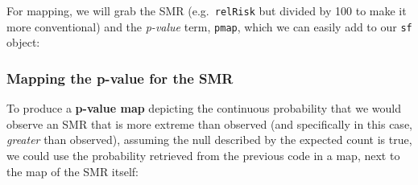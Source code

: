 \documentclass[
]{book}
\newenvironment{Shaded}{\begin{snugshade}}{\end{snugshade}}
\newcommand{\DecValTok}[1]{\textcolor[rgb]{0.00,0.00,0.81}{#1}}
\newcommand{\NormalTok}[1]{#1}
\newcommand{\OtherTok}[1]{\textcolor[rgb]{0.56,0.35,0.01}{#1}}
\newcommand{\SpecialCharTok}[1]{\textcolor[rgb]{0.00,0.00,0.00}{#1}}
\begin{document}
For mapping, we will grab the SMR (e.g.~\texttt{relRisk} but divided by 100 to make it more conventional) and the \emph{p-value} term, \texttt{pmap}, which we can easily add to our \texttt{sf} object:

\begin{Shaded}
\end{Shaded}

\hypertarget{mapping-the-p-value-for-the-smr}{%
\subsubsection{Mapping the p-value for the SMR}\label{mapping-the-p-value-for-the-smr}}

To produce a \textbf{p-value map} depicting the continuous probability that we would observe an SMR that is more extreme than observed (and specifically in this case, \emph{greater} than observed), assuming the null described by the expected count is true, we could use the probability retrieved from the previous code in a map, next to the map of the SMR itself:
\end{document}
